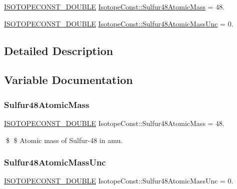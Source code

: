 \begin{DoxyCompactItemize}
\item 
\mbox{\hyperlink{group___isotope_const-_macros_ga8f45a7272ce02c0b4c65c44636ed719a}{I\+S\+O\+T\+O\+P\+E\+C\+O\+N\+S\+T\+\_\+\+D\+O\+U\+B\+LE}} \mbox{\hyperlink{group___isotope_const-_sulfur-_s48_gabeb3499f647c200211abfe3a5a83da03}{Isotope\+Const\+::\+Sulfur48\+Atomic\+Mass}} = 48.
\item 
\mbox{\hyperlink{group___isotope_const-_macros_ga8f45a7272ce02c0b4c65c44636ed719a}{I\+S\+O\+T\+O\+P\+E\+C\+O\+N\+S\+T\+\_\+\+D\+O\+U\+B\+LE}} \mbox{\hyperlink{group___isotope_const-_sulfur-_s48_ga96d07224c31263b376a049d50b2f5d52}{Isotope\+Const\+::\+Sulfur48\+Atomic\+Mass\+Unc}} = 0.
\end{DoxyCompactItemize}


\subsection{Detailed Description}


\subsection{Variable Documentation}
\mbox{\label{group___isotope_const-_sulfur-_s48_gabeb3499f647c200211abfe3a5a83da03}} 
\subsubsection{\texorpdfstring{Sulfur48\+Atomic\+Mass}{Sulfur48AtomicMass}}
{\footnotesize\ttfamily \mbox{\hyperlink{group___isotope_const-_macros_ga8f45a7272ce02c0b4c65c44636ed719a}{I\+S\+O\+T\+O\+P\+E\+C\+O\+N\+S\+T\+\_\+\+D\+O\+U\+B\+LE}} Isotope\+Const\+::\+Sulfur48\+Atomic\+Mass = 48.}

\$ \$ Atomic mass of Sulfur-\/48 in amu. \mbox{\label{group___isotope_const-_sulfur-_s48_ga96d07224c31263b376a049d50b2f5d52}} 
\subsubsection{\texorpdfstring{Sulfur48\+Atomic\+Mass\+Unc}{Sulfur48AtomicMassUnc}}
{\footnotesize\ttfamily \mbox{\hyperlink{group___isotope_const-_macros_ga8f45a7272ce02c0b4c65c44636ed719a}{I\+S\+O\+T\+O\+P\+E\+C\+O\+N\+S\+T\+\_\+\+D\+O\+U\+B\+LE}} Isotope\+Const\+::\+Sulfur48\+Atomic\+Mass\+Unc = 0.}

